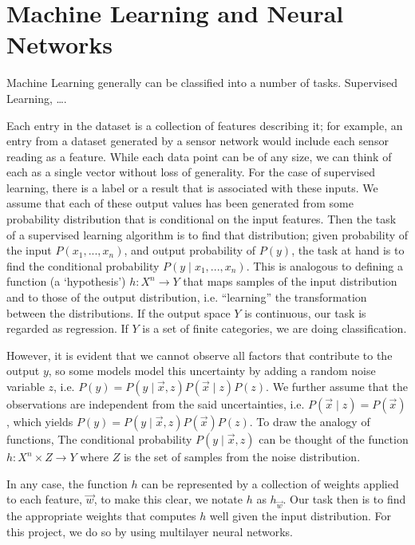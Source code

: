\documentclass[12pt,a4paper,]{report}
\begin{document}
\hypertarget{machine-learning-and-neural-networks}{%
\section{Machine Learning and Neural
Networks}\label{machine-learning-and-neural-networks}}

Machine Learning generally can be classified into a number of tasks.
Supervised Learning, \ldots{}.

Each entry in the dataset is a collection of features describing it; for
example, an entry from a dataset generated by a sensor network would
include each sensor reading as a feature. While each data point can be
of any size, we can think of each as a single vector without loss of
generality. For the case of supervised learning, there is a label or a
result that is associated with these inputs. We assume that each of
these output values has been generated from some probability
distribution that is conditional on the input features. Then the task of
a supervised learning algorithm is to find that distribution; given
probability of the input \(P(x_1, ..., x_n)\), and output probability of
\(P(y)\), the task at hand is to find the conditional probability
\(P(y \mid x_1, ..., x_n)\). This is analogous to defining a function (a
`hypothesis') \(h: X^n \rightarrow Y\) that maps samples of the input
distribution and to those of the output distribution, i.e. ``learning''
the transformation between the distributions. If the output space \(Y\)
is continuous, our task is regarded as regression. If \(Y\) is a set of
finite categories, we are doing classification.

However, it is evident that we cannot observe all factors that
contribute to the output \(y\), so some models model this uncertainty by
adding a random noise variable \(z\), i.e.
\(P(y) = P(y \mid \vec{x}, z) P(\vec{x} \mid z) P(z)\). We further
assume that the observations are independent from the said
uncertainties, i.e. \(P(\vec{x} \mid z) = P(\vec{x})\), which yields
\(P(y) = P(y \mid \vec{x}, z) P(\vec{x}) P(z)\). To draw the analogy of
functions, The conditional probability \(P(y \mid \vec{x}, z)\) can be
thought of the function \(h: X^n \times Z \rightarrow Y\) where \(Z\) is
the set of samples from the noise distribution.

In any case, the function \(h\) can be represented by a collection of
weights applied to each feature, \(\vec{w}\), to make this clear, we
notate \(h\) as \(h_{\vec{w}}\). Our task then is to find the
appropriate weights that computes \(h\) well given the input
distribution. For this project, we do so by using multilayer neural
networks.
\end{document}
